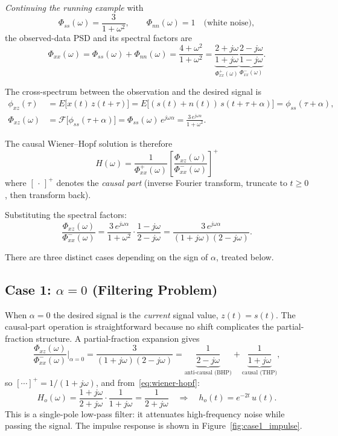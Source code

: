\documentclass[12pt]{book}
\theoremstyle{definition}
\newcommand{\F}{\mathcal{F}}
\begin{document}

\medskip\noindent
\textit{Continuing the running example} with
\[
  \Phi_{ss}(\omega) = \frac{3}{1+\omega^2}, \qquad
  \Phi_{nn}(\omega) = 1 \quad \text{(white noise)},
\]
the observed-data PSD and its spectral factors are
\[
  \Phi_{xx}(\omega)
    = \Phi_{ss}(\omega)+\Phi_{nn}(\omega)
    = \frac{4+\omega^2}{1+\omega^2}
    = \underbrace{\frac{2+j\omega}{1+j\omega}}_{\Phi_{xx}^+(\omega)}
      \underbrace{\frac{2-j\omega}{1-j\omega}}_{\Phi_{xx}^-(\omega)}.
\]

The cross-spectrum between the observation and the desired signal is
\begin{align*}
  \phi_{xz}(\tau)
    &= E\!\bigl[x(t)\,z(t+\tau)\bigr]
     = E\!\bigl[(s(t)+n(t))\,s(t+\tau+\alpha)\bigr]
     = \phi_{ss}(\tau+\alpha),\\[4pt]
  \Phi_{xz}(\omega)
    &= \F\!\bigl[\phi_{ss}(\tau+\alpha)\bigr]
     = \Phi_{ss}(\omega)\,e^{j\omega\alpha}
     = \frac{3\,e^{j\omega\alpha}}{1+\omega^2}.
\end{align*}

The causal Wiener--Hopf solution is therefore
\begin{equation}
  \boxed{H(\omega)
    = \frac{1}{\Phi_{xx}^{+}(\omega)}
      \left[\frac{\Phi_{xz}(\omega)}{\Phi_{xx}^{-}(\omega)}\right]^{\!+}}
  \label{eq:wiener-hopf}
\end{equation}
where $[\,\cdot\,]^+$ denotes the \emph{causal part} (inverse Fourier
transform, truncate to $t\ge 0$, then transform back).

Substituting the spectral factors:
\[
  \frac{\Phi_{xz}(\omega)}{\Phi_{xx}^{-}(\omega)}
    = \frac{3\,e^{j\omega\alpha}}{1+\omega^2}\cdot\frac{1-j\omega}{2-j\omega}
    = \frac{3\,e^{j\omega\alpha}}{(1+j\omega)(2-j\omega)}.
\]

There are three distinct cases depending on the sign of $\alpha$, treated below.

\subsection*{Case 1: $\alpha = 0$ \quad (Filtering Problem)}
\label{ssec:filtering}

When $\alpha=0$ the desired signal is the \emph{current} signal value,
$z(t)=s(t)$.  The causal-part operation is straightforward because no shift
complicates the partial-fraction structure.  A partial-fraction expansion gives
\[
  \frac{\Phi_{xz}(\omega)}{\Phi_{xx}^{-}(\omega)}\bigg|_{\alpha=0}
  = \frac{3}{(1+j\omega)(2-j\omega)}
  = \underbrace{\frac{1}{2-j\omega}}_{\text{anti-causal (BHP)}}
    +\underbrace{\frac{1}{1+j\omega}}_{\text{causal (THP)}},
\]
so $[\cdots]^+ = 1/(1+j\omega)$, and from~\eqref{eq:wiener-hopf}:
\[
  H_o(\omega) = \frac{1+j\omega}{2+j\omega}\cdot\frac{1}{1+j\omega}
              = \frac{1}{2+j\omega}
  \quad\Longrightarrow\quad
  h_o(t) = e^{-2t}\,u(t).
\]
This is a single-pole low-pass filter: it attenuates high-frequency noise
while passing the signal.  The impulse response is shown in
Figure~\ref{fig:case1_impulse}.
\end{document}
